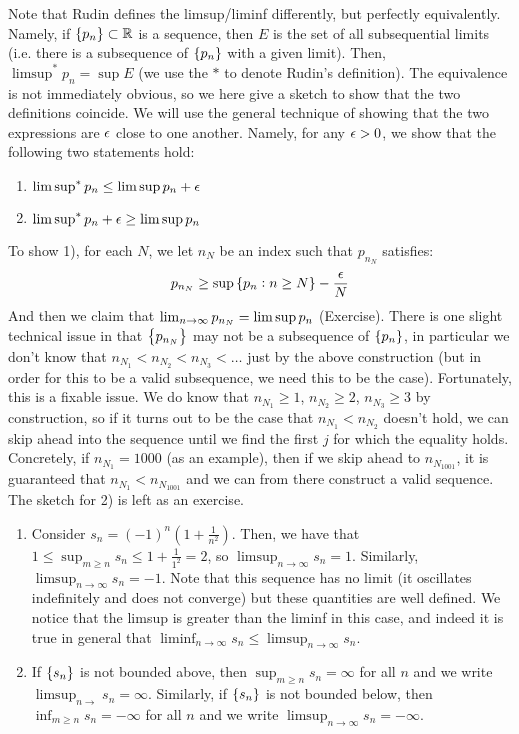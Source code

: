 Note that Rudin defines the limsup/liminf differently, but perfectly equivalently. Namely, if $\set{p_n} \subset \mathbb{R}$ is a sequence, then $E$ is the set of all subsequential limits (i.e. there is a subsequence of $\set{p_n}$ with a given limit). Then, $\limsup^* p_n = \sup E$ (we use the $*$ to denote Rudin's definition). The equivalence is not immediately obvious, so we here give a sketch to show that the two definitions coincide. We will use the general technique of showing that the two expressions are $\epsilon$ close to one another. Namely, for any $\epsilon > 0$, we show that the following two statements hold:
\begin{enumerate}[1)]
    \item $\limsup^* p_n \leq \limsup p_n + \epsilon$
    \item $\limsup^* p_n + \epsilon \geq \limsup p_n$
\end{enumerate}
To show 1), for each $N$, we let $n_N$ be an index such that $p_{n_N}$ satisfies:
\begin{align*}
    p_{n_N} \geq \sup\set{p_n: n \geq N} - \frac{\epsilon}{N}
\end{align*}
And then we claim that $\lim_{n \rightarrow \infty} p_{n_N} = \limsup p_n$ (Exercise). There is one slight technical issue in that $\set{p_{n_N}}$ may not be a subsequence of $\set{p_n}$, in particular we don't know that $n_{N_1} < n_{N_2} < n_{N_3} < \ldots$ just by the above construction (but in order for this to be a valid subsequence, we need this to be the case). Fortunately, this is a fixable issue. We do know that $n_{N_1} \geq 1$, $n_{N_2} \geq 2$, $n_{N_3} \geq 3$ by construction, so if it turns out to be the case that $n_{N_1} < n_{N_2}$ doesn't hold, we can skip ahead into the sequence until we find the first $j$ for which the equality holds. Concretely, if $n_{N_1} = 1000$ (as an example), then if we skip ahead to $n_{N_{1001}}$, it is guaranteed that $n_{N_1} < n_{N_{1001}}$ and we can from there construct a valid sequence. The sketch for 2) is left as an exercise. 

\begin{nexample}{}{}
    \begin{enumerate}
        \item Consider $s_n = (-1)^n\left(1 + \frac{1}{n^2}\right)$. Then, we have that $1 \leq \sup_{m \geq n} s_n \leq 1 + \frac{1}{1^2} = 2$, so $\limsup_{n \rightarrow \infty} s_n = 1$. Similarly, $\limsup_{n \rightarrow \infty} s_n = -1$. Note that this sequence has no limit (it oscillates indefinitely and does not converge) but these quantities are well defined. We notice that the limsup is greater than the liminf in this case, and indeed it is true in general that $\liminf_{n \rightarrow \infty} s_n \leq \limsup_{n \rightarrow \infty} s_n$. 
        \item If $\set{s_n}$ is not bounded above, then $\sup_{m \geq n} s_n = \infty$ for all $n$ and we write $\limsup_{n \rightarrow} s_n = \infty$. Similarly, if $\set{s_n}$ is not bounded below, then $\inf_{m \geq n} s_n = -\infty$ for all $n$ and we write $\limsup_{n \rightarrow \infty} s_n = -\infty$.
    \end{enumerate}
\end{nexample}

